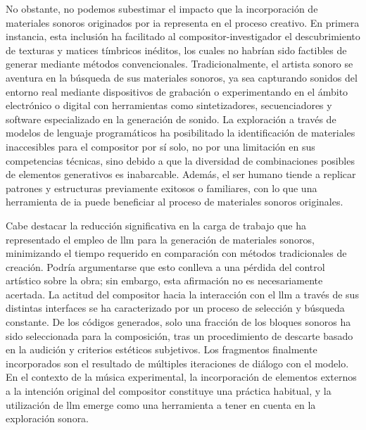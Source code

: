 No obstante, no podemos subestimar el impacto que la incorporación de materiales sonoros originados por \gls{ia} representa en el proceso creativo. En primera instancia, esta inclusión ha facilitado al compositor-investigador el descubrimiento de texturas y matices tímbricos inéditos, los cuales no habrían sido factibles de generar mediante métodos convencionales. Tradicionalmente, el artista sonoro se aventura en la búsqueda de sus materiales sonoros, ya sea capturando sonidos del entorno real mediante dispositivos de grabación o experimentando en el ámbito electrónico o digital con herramientas como sintetizadores, secuenciadores y software especializado en la generación de sonido. La exploración a través de modelos de lenguaje programáticos ha posibilitado la identificación de materiales inaccesibles para el compositor por sí solo, no por una limitación en sus competencias técnicas, sino debido a que la diversidad de combinaciones posibles de elementos generativos es inabarcable. Además, el ser humano tiende a replicar patrones y estructuras previamente exitosos o familiares, con lo que una herramienta de \gls{ia} puede beneficiar al proceso de materiales sonoros originales.

Cabe destacar la reducción significativa en la carga de trabajo que ha representado el empleo de \gls{llm} para la generación de materiales sonoros, minimizando el tiempo requerido en comparación con métodos tradicionales de creación. Podría argumentarse que esto conlleva a una pérdida del control artístico sobre la obra; sin embargo, esta afirmación no es necesariamente acertada. La actitud del compositor hacia la interacción con el \gls{llm} a través de sus distintas interfaces se ha caracterizado por un proceso de selección y búsqueda constante. De los códigos generados, solo una fracción de los bloques sonoros ha sido seleccionada para la composición, tras un procedimiento de descarte basado en la audición y criterios estéticos subjetivos. Los fragmentos finalmente incorporados son el resultado de múltiples iteraciones de diálogo con el modelo. En el contexto de la música experimental, la incorporación de elementos externos a la intención original del compositor constituye una práctica habitual, y la utilización de \gls{llm} emerge como una herramienta a tener en cuenta en la exploración sonora.

